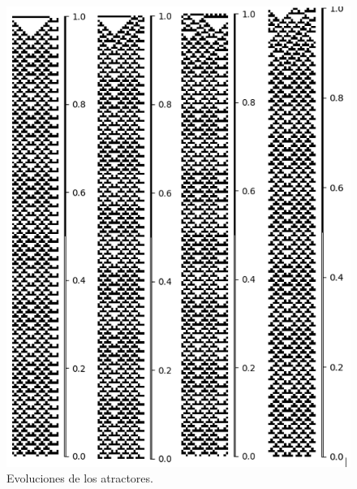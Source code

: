 \documentclass[11pt]{article}
\begin{document}
			\begin{figure}[H]
			\centering
			\includegraphics[scale=0.3]{resources/Atractores54/atractor_54_size_21_res.png}
			\caption{Evoluciones de los atractores.}\label{fig:picture}
			\end{figure}
\end{document}
